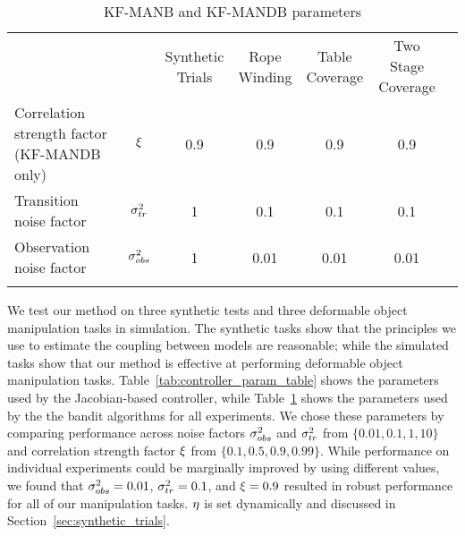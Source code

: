\begin{table}[t]
\centering
\caption{KF-MANB and KF-MANDB parameters}
\label{tab:param_table}
\begin{tabular}{lcccccc}
\hline\noalign{\smallskip}
                                                            &                               & \makecell{Synthetic\\Trials} 
                                                                                            & \makecell{Rope\\Winding}
                                                                                            & \makecell{Table\\Coverage}
                                                                                            & \makecell{Two Stage\\Coverage} \\
\noalign{\smallskip}\hline\noalign{\smallskip}
\makecell[l]{Correlation strength factor\\(KF-MANDB only)}  & $\xi$          &  0.9 &   0.9 &   0.9 &   0.9 \\
\noalign{\smallskip}
Transition noise factor                                     & $\sigma_{tr}^2$    &    1 &   0.1 &   0.1 &   0.1 \\
\noalign{\smallskip}
Observation noise factor                                    & $\sigma_{obs}^2$   &    1 &  0.01 &  0.01 &  0.01 \\
\noalign{\smallskip}\hline
\end{tabular}
\end{table}

We test our method on three synthetic tests and three deformable object manipulation tasks in simulation. The synthetic tasks show that the principles we use to estimate the coupling between models are reasonable; while the simulated tasks show that our method is effective at performing deformable object manipulation tasks. Table~\ref{tab:controller_param_table} shows the parameters used by the Jacobian-based controller, while Table~\ref{tab:param_table} shows the parameters used by the the bandit algorithms for all experiments. We chose these parameters by comparing performance across noise factors $\sigma_{obs}^2$ and $\sigma_{tr}^2$ from $\{0.01, 0.1, 1, 10\}$ and correlation strength factor $\xi$ from $\{0.1, 0.5, 0.9, 0.99\}$. While performance on individual experiments could be marginally improved by using different values, we found that $\sigma_{obs}^2=0.01$, $\sigma_{tr}^2=0.1$, and $\xi=0.9$ resulted in robust performance for all of our manipulation tasks. $\eta$ is set dynamically and discussed in Section~\ref{sec:synthetic_trials}.




